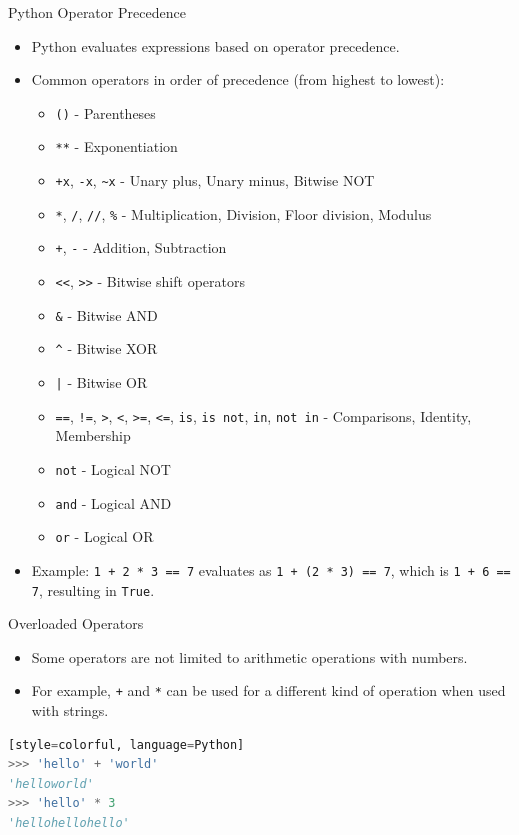 \documentclass{beamer}
\begin{document}
\begin{frame}{Python Operator Precedence}
    \begin{itemize}
        \item Python evaluates expressions based on operator precedence.
        \item Common operators in order of precedence (from highest to lowest):
        \begin{itemize}
            \item \texttt{()} - Parentheses
            \item \texttt{**} - Exponentiation
            \item \texttt{+x}, \texttt{-x}, \texttt{\textasciitilde{}x} - Unary plus, Unary minus, Bitwise NOT
            \item \texttt{*}, \texttt{/}, \texttt{//}, \texttt{\%} - Multiplication, Division, Floor division, Modulus
            \item \texttt{+}, \texttt{-} - Addition, Subtraction
            \item \texttt{<<}, \texttt{>>} - Bitwise shift operators
            \item \texttt{\&} - Bitwise AND
            \item \texttt{\textasciicircum} - Bitwise XOR
            \item \texttt{|} - Bitwise OR
            \item \texttt{==}, \texttt{!=}, \texttt{>}, \texttt{<}, \texttt{>=}, \texttt{<=}, \texttt{is}, \texttt{is not}, \texttt{in}, \texttt{not in} - Comparisons, Identity, Membership
            \item \texttt{not} - Logical NOT
            \item \texttt{and} - Logical AND
            \item \texttt{or} - Logical OR
        \end{itemize}
        \item Example: \texttt{1 + 2 * 3 == 7} evaluates as \texttt{1 + (2 * 3) == 7}, which is \texttt{1 + 6 == 7}, resulting in \texttt{True}.
    \end{itemize}
\end{frame}
\begin{frame}[fragile]{Overloaded Operators}
    \begin{itemize}
        \item Some operators are not limited to arithmetic operations with numbers.
        \item For example, \texttt{+} and \texttt{*} can be used for a different kind of operation when used with strings.
    \end{itemize}
    \begin{lstlisting}[style=colorful, language=Python][style=colorful, language=Python]
>>> 'hello' + 'world'
'helloworld'
>>> 'hello' * 3
'hellohellohello'
    \end{lstlisting}
\end{frame}
\end{document}
